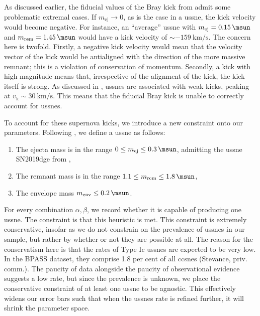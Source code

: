 As discussed earlier, the fiducial values of the Bray kick from \citet{Bray:2018} admit some problematic extremal cases. If $m_\text{ej}\to 0$, as is the case in a \gls{ussne}, the kick velocity would become negative. For instance, an ``average'' \gls{ussne} with $m_\text{ej}=\SI{0.15}{\msun}$ and $m_\text{rem}=\SI{1.45}{\msun}$ would have a kick velocity of $\sim\SI{-159}{\km\per\s}$. The concern here is twofold. Firstly, a negative kick velocity would mean that the velocity vector of the kick would be antialigned with the direction of the more massive remnant; this is a violation of conservation of momentum. Secondly, a kick with high magnitude means that, irrespective of the alignment of the kick, the kick itself is strong. As discussed in \citet{Willcox:2021}, \glspl{ussne} are associated with weak kicks, peaking at $v_\text{k}\sim\SI{30}{\km\per\s}$. This means that the fiducial Bray kick is unable to correctly account for \glspl{ussne}.

To account for these supernova kicks, we introduce a new constraint onto our parameters. Following \citet{Tauris:2015}, we define a \gls{ussne} as follows:

\begin{enumerate}
    \item The ejecta mass is in the range $0 \leq m_\text{ej} \leq \SI{0.3}{\msun}$, admitting the \gls{ussne} SN2019dge from \citet{Yao:2020},
    \item The remnant mass is in the range $1.1 \leq m_\text{rem} \leq \SI{1.8}{\msun}$,
    \item The envelope mass $m_\text{env}\leq\SI{0.2}{\msun}$.
\end{enumerate}

For every combination $\alpha, \beta$, we record whether it is capable of producing one \gls{ussne}. The constraint is that this heuristic is met. This constraint is extremely conservative, insofar as we do not constrain on the prevalence of \glspl{ussne} in our sample, but rather by whether or not they are possible at all. The reason for the conservatism here is that the rates of Type Ic \glspl{ussne} are expected to be very low. In the BPASS dataset, they comprise 1.8 per cent of all \glspl{ccsne} (Stevance, priv. comm.). The paucity of data alongside the paucity of observational evidence suggests a low rate, but since the prevalence is unknown, we place the conservative constraint of at least one \gls{ussne} to be agnostic. This effectively widens our error bars such that when the \glspl{ussne} rate is refined further, it will shrink the parameter space.

